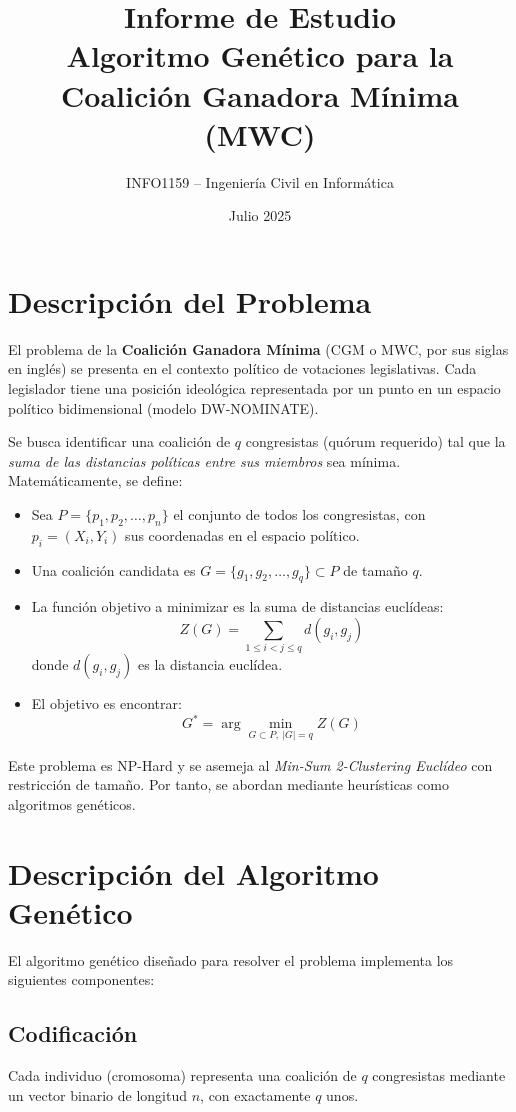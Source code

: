 \documentclass[12pt]{article}
\title{Informe de Estudio\\Algoritmo Genético para la Coalición Ganadora Mínima (MWC)}
\author{INFO1159 – Ingeniería Civil en Informática}
\date{Julio 2025}
\begin{document}
\maketitle

\section{Descripción del Problema}

El problema de la \textbf{Coalición Ganadora Mínima} (CGM o MWC, por sus siglas en inglés) se presenta en el contexto político de votaciones legislativas. Cada legislador tiene una posición ideológica representada por un punto en un espacio político bidimensional (modelo DW-NOMINATE). 

Se busca identificar una coalición de $q$ congresistas (quórum requerido) tal que la \emph{suma de las distancias políticas entre sus miembros} sea mínima. Matemáticamente, se define:

\begin{itemize}
    \item Sea $P = \{p_1, p_2, \dots, p_n\}$ el conjunto de todos los congresistas, con $p_i = (X_i, Y_i)$ sus coordenadas en el espacio político.
    \item Una coalición candidata es $G = \{g_1, g_2, \dots, g_q\} \subset P$ de tamaño $q$.
    \item La función objetivo a minimizar es la suma de distancias euclídeas:
    \[
        Z(G) = \sum_{1 \le i < j \le q} d(g_i, g_j)
    \]
    donde $d(g_i, g_j)$ es la distancia euclídea.
    \item El objetivo es encontrar:
    \[
        G^* = \arg\min_{G \subset P,\ |G| = q} Z(G)
    \]
\end{itemize}

Este problema es NP-Hard y se asemeja al \emph{Min-Sum 2-Clustering Euclídeo} con restricción de tamaño. Por tanto, se abordan mediante heurísticas como algoritmos genéticos.

\section{Descripción del Algoritmo Genético}

El algoritmo genético diseñado para resolver el problema implementa los siguientes componentes:

\subsection*{Codificación}
Cada individuo (cromosoma) representa una coalición de $q$ congresistas mediante un vector binario de longitud $n$, con exactamente $q$ unos.
\end{document}
